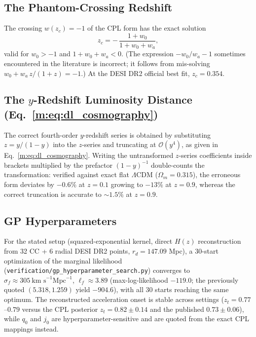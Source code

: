 \documentclass[aps,prd,preprint,superscriptaddress,nofootinbib]{revtex4-2}
\begin{document}
\subsection{The Phantom-Crossing Redshift}

The crossing $w(z_c) = -1$ of the CPL form has the exact solution
\begin{equation}
    z_c = -\,\frac{1 + w_0}{1 + w_0 + w_a},
\end{equation}
valid for $w_0 > -1$ and $1 + w_0 + w_a < 0$. (The expression $-w_0/w_a - 1$ sometimes encountered in the literature is incorrect; it follows from mis-solving $w_0 + w_a\,z/(1+z) = -1$.) At the DESI DR2 official best fit, $z_c = 0.354$.

\subsection{The $y$-Redshift Luminosity Distance (Eq.~\ref{m:eq:dl_cosmography})}

The correct fourth-order $y$-redshift series is obtained by substituting $z = y/(1-y)$ into the $z$-series and truncating at $\mathcal{O}(y^4)$, as given in Eq.~\ref{m:eq:dl_cosmography}. Writing the untransformed $z$-series coefficients inside brackets multiplied by the prefactor $(1-y)^{-1}$ double-counts the transformation: verified against exact flat $\Lambda$CDM ($\Omega_m = 0.315$), the erroneous form deviates by $-0.6\%$ at $z = 0.1$ growing to $-13\%$ at $z = 0.9$, whereas the correct truncation is accurate to $\sim 1.5\%$ at $z = 0.9$.

\subsection{GP Hyperparameters}

For the stated setup (squared-exponential kernel, direct $H(z)$ reconstruction from 32 CC + 6 radial DESI DR2 points, $r_d = 147.09$ Mpc), a 30-start optimization of the marginal likelihood (\texttt{verification/gp\_hyperparameter\_search.py}) converges to $\sigma_f \approx 305~\text{km~s}^{-1}\text{Mpc}^{-1}$, $\ell_f \approx 3.89$ (max-log-likelihood $-119.0$; the previously quoted $(5.318, 1.259)$ yield $-904.6$), with all 30 starts reaching the same optimum. The reconstructed acceleration onset is stable across settings ($z_t = 0.77$--$0.79$ versus the CPL posterior $z_t = 0.82 \pm 0.14$ and the published $0.73 \pm 0.06$), while $q_0$ and $j_0$ are hyperparameter-sensitive and are quoted from the exact CPL mappings instead.
\end{document}

